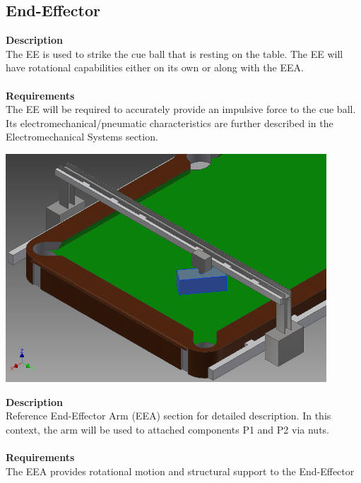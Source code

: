 \documentclass[titlepage]{article}
\begin{document}
\newpage
\subsection{End-Effector}
\textbf{Description}\\
The EE is used to strike the cue ball that is resting on the table. The EE will have rotational capabilities either on its own or along with the EEA.\\~\\
\textbf{Requirements}\\
The EE will be required to accurately provide an impulsive force to the cue ball. Its electromechanical/pneumatic characteristics are further described in the Electromechanical Systems section.
\begin{center}
	\includegraphics[width = 0.9\textwidth]{endEffector.png}	%
\label{fig:eeFig}
\end{center}

\textbf{Description}\\
Reference End-Effector Arm (EEA) section for detailed description. In this context, the arm will be used to attached components P1 and P2 via nuts.\\~\\
\textbf{Requirements}\\
The EEA provides rotational motion and structural support to the End-Effector
\end{document}
